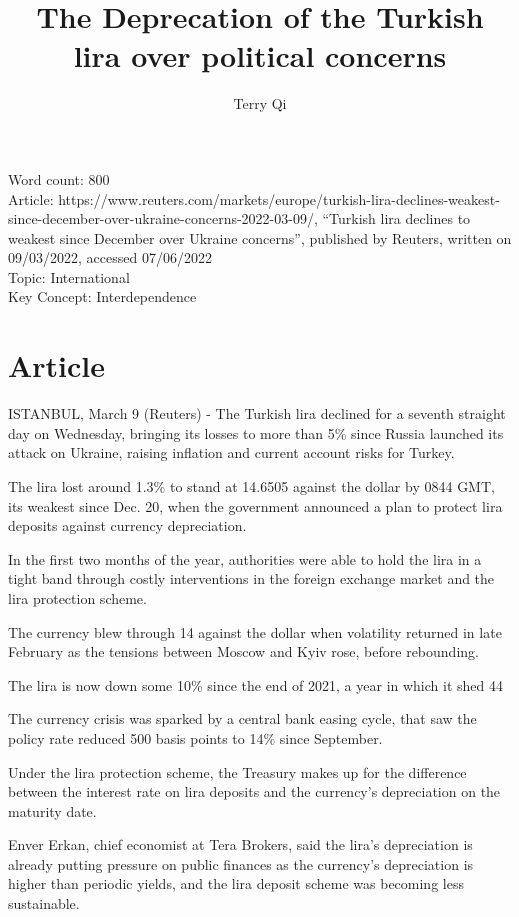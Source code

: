 \documentclass[a4paper,12pt]{article}
\title{The Deprecation of the Turkish lira over political concerns}
\author{Terry Qi}
\begin{document}
\maketitle
Word count: 800\\
Article: https://www.reuters.com/markets/europe/turkish-lira-declines-weakest-since-december-over-ukraine-concerns-2022-03-09/, ``Turkish lira declines to weakest since December over Ukraine concerns'', published by Reuters, written on 09/03/2022, accessed 07/06/2022\\
Topic: International\\
Key Concept: Interdependence

\newpage

\section*{Article}
ISTANBUL, March 9 (Reuters) - The Turkish lira declined for a seventh straight day on Wednesday, bringing its losses to more than 5\% since Russia launched its attack on Ukraine, raising inflation and current account risks for Turkey.

The lira lost around 1.3\% to stand at 14.6505 against the dollar by 0844 GMT, its weakest since Dec. 20, when the government announced a plan to protect lira deposits against currency depreciation.

In the first two months of the year, authorities were able to hold the lira in a tight band through costly interventions in the foreign exchange market and the lira protection scheme.

The currency blew through 14 against the dollar when volatility returned in late February as the tensions between Moscow and Kyiv rose, before rebounding.

The lira is now down some 10\% since the end of 2021, a year in which it shed 44%

The currency crisis was sparked by a central bank easing cycle, that saw the policy rate reduced 500 basis points to 14\% since September.

Under the lira protection scheme, the Treasury makes up for the difference between the interest rate on lira deposits and the currency's depreciation on the maturity date.

Enver Erkan, chief economist at Tera Brokers, said the lira's depreciation is already putting pressure on public finances as the currency's depreciation is higher than periodic yields, and the lira deposit scheme was becoming less sustainable.
\end{document}
